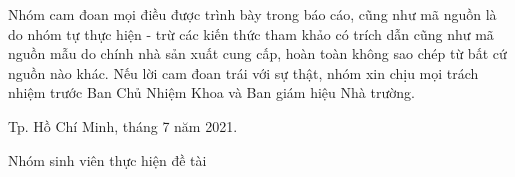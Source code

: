 Nhóm cam đoan mọi điều được trình bày trong báo cáo, cũng như mã nguồn là do nhóm tự thực hiện - trừ các kiến thức tham khảo có trích dẫn cũng như mã nguồn mẫu do chính nhà sản xuất cung cấp, hoàn toàn không sao chép từ bất cứ nguồn nào khác. Nếu lời cam đoan trái với sự thật, nhóm xin chịu mọi trách nhiệm trước Ban Chủ Nhiệm Khoa và Ban giám hiệu Nhà trường.
\begin{flushright}
Tp. Hồ Chí Minh, tháng 7 năm 2021.\par

Nhóm sinh viên thực hiện đề tài
\end{flushright}